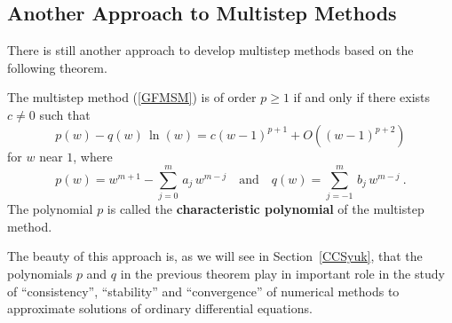 \subsection{Another Approach to Multistep Methods}\label{AAMM}

There is still another approach to develop multistep methods based on
the following theorem.

\begin{theorem}
The multistep method (\ref{GFMSM}) is of order $p\geq 1$ if and only
if there exists $c \neq 0$ such that
\[
p(w) - q(w) \,\ln(w) = c(w-1)^{p+1} + O((w-1)^{p+2})
\]
for $w$ near $1$, where
\[
p(w) =  w^{m+1} - \sum_{j=0}^m\,a_j\,w^{m-j} \quad\text{and} \quad
q(w) = \sum_{j=-1}^m\,b_j\,w^{m-j} \ .
\]
The polynomial $p$ is called the
{\bfseries characteristic polynomial} of the multistep method. 
\label{link_order_char}
\end{theorem}

The beauty of this approach is, as we will see in
Section~\ref{CCSyuk}, that the polynomials $p$ and $q$
in the previous theorem play in important role in the study of
``consistency'', ``stability'' and ``convergence'' of numerical
methods to approximate solutions of ordinary differential equations.

